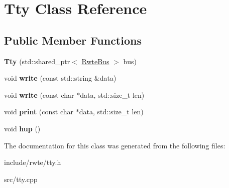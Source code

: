 \hypertarget{classTty}{}\section{Tty Class Reference}
\label{classTty}
\subsection*{Public Member Functions}
\begin{DoxyCompactItemize}
\item 
\mbox{\label{classTty_a327ddb3f3afb56f36016cc2b41349fe4}} 
{\bfseries Tty} (std\+::shared\+\_\+ptr$<$ \mbox{\hyperlink{classBus}{Rwte\+Bus}} $>$ bus)
\item 
\mbox{\label{classTty_a1d604b5171d9c00425ef3ebe6087d95b}} 
void {\bfseries write} (const std\+::string \&data)
\item 
\mbox{\label{classTty_a018589ed97a33139c2b61837e3d56682}} 
void {\bfseries write} (const char $\ast$data, std\+::size\+\_\+t len)
\item 
\mbox{\label{classTty_aa79101d583e85a969197e1ee486ff503}} 
void {\bfseries print} (const char $\ast$data, std\+::size\+\_\+t len)
\item 
\mbox{\label{classTty_af6b78a29f28157d90950fa631a310f70}} 
void {\bfseries hup} ()
\end{DoxyCompactItemize}


The documentation for this class was generated from the following files\+:\begin{DoxyCompactItemize}
\item 
include/rwte/tty.\+h\item 
src/tty.\+cpp\end{DoxyCompactItemize}
